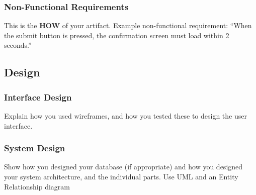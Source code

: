 \subsubsection{Non-Functional Requirements}
This is the \textbf{HOW} of your artifact. Example non-functional requirement: ``When the submit button is pressed, the confirmation screen must load within 2 seconds.''

\subsection{Design}

\subsubsection{Interface Design}
Explain how you used wireframes, and how you tested these to design the user interface.


 \subsubsection{System Design}
 Show how you designed your database (if appropriate) and how you designed your system architecture, and the individual parts. Use UML and an Entity Relationship diagram

